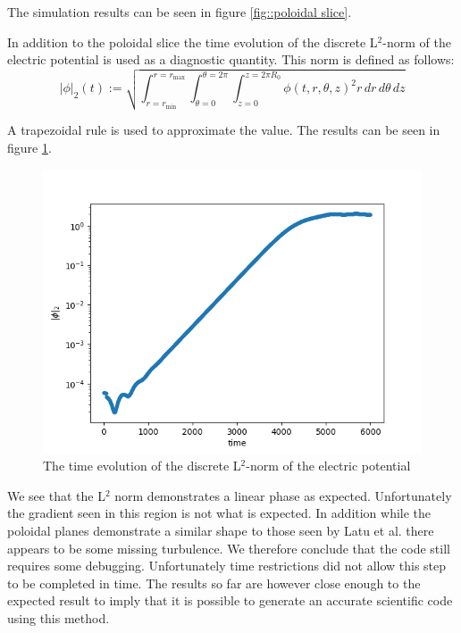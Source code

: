 The simulation results can be seen in figure \ref{fig::poloidal slice}. 


In addition to the poloidal slice the time evolution of the discrete L$^2$-norm of the electric potential is used as a diagnostic quantity. This norm is defined as follows:
\begin{equation}
 \left|\phi\right|_2(t):=\sqrt{\int_{r=r_{\min}}^{r=r_{\max}}\int_{\theta=0}^{\theta=2\pi}\int_{z=0}^{z=2\pi R_0}\phi(t,r,\theta,z)^2r\, dr\, d\theta\, dz}
\end{equation}

A trapezoidal rule is used to approximate the value. The results can be seen in figure \ref{fig::l2 phi}.

\begin{figure}
 \centering
 \includegraphics[width=.7\textwidth]{Figs/SimResults/l2}
 \caption{\label{fig::l2 phi}The time evolution of the discrete L$^2$-norm of the electric potential}
\end{figure}

We see that the L$^2$ norm demonstrates a linear phase as expected.
Unfortunately the gradient seen in this region is not what is expected. In addition while the poloidal planes demonstrate a similar shape to those seen by Latu et al. there appears to be some missing turbulence. We therefore conclude that the code still requires some debugging. Unfortunately time restrictions did not allow this step to be completed in time. The results so far are however close enough to the expected result to imply that it is possible to generate an accurate scientific code using this method.


